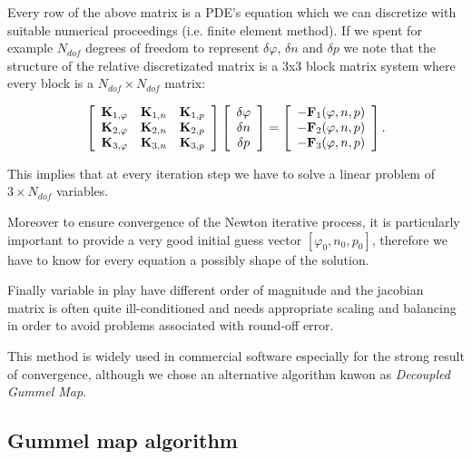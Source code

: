  Every row of the above matrix is a PDE's equation which we can discretize with suitable numerical proceedings (i.e. finite element method). If we spent for example $N_{dof}$ degrees of freedom to represent $\delta \varphi$, $\delta n$ and $\delta p$ we note that the structure of the relative discretizated matrix is a 3x3 block matrix system where every block is a $N_{dof} \times N_{dof}$ matrix:


\begin{equation}
\left[
\begin{array}{ccc}
\mathbf{K}_{1,\varphi} & \mathbf{K}_{1,n} & \mathbf{K}_{1,p} \\
\mathbf{K}_{2,\varphi} & \mathbf{K}_{2,n} & \mathbf{K}_{2,p} \\
\mathbf{K}_{3,\varphi} & \mathbf{K}_{3,n} & \mathbf{K}_{3,p} \\
\end{array}
\right]
\left[
\begin{array}{c}
\delta \varphi  \\
\delta n  \\
\delta p 
\end{array}
\right]
=
\left[
\begin{array}{c}
-\mathbf{F}_1(\varphi,n,p) \\
-\mathbf{F}_2(\varphi,n,p)\\
-\mathbf{F}_3(\varphi,n,p)
\end{array}
\right].
\end{equation}

This implies that at every iteration step we have to solve a linear problem of $3 \times N_{dof}$ variables.

Moreover to ensure convergence of the Newton iterative process, it is particularly important to provide a very good initial guess vector $[\varphi_0,n_0,p_0]$, therefore we have to know for every equation a possibly shape of the solution.

Finally variable in play have different order of magnitude and the jacobian matrix is often quite ill-conditioned and needs appropriate scaling and balancing in order to avoid problems associated with round-off error. 

This method is widely used in commercial software especially for the strong result of convergence, although we chose an alternative algorithm knwon as \textit{Decoupled Gummel Map}.


\subsection{Gummel map algorithm}

